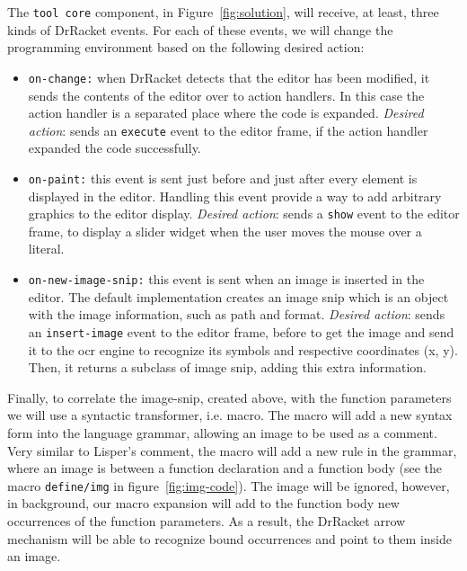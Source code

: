 The \texttt{tool core} component, in Figure~\ref{fig:solution}, will receive, at least, three kinds of DrRacket events. For each of these events, we will change the programming environment based on the following desired action:

\begin{itemize}
	\item \texttt{on-change:} when DrRacket detects that the editor has been modified, it sends the contents of the editor over to action handlers.
	In this case the action handler is a separated place where the code is expanded. \textit{Desired action}: sends an \texttt{execute} event to the editor frame, if the action handler expanded the code successfully. 

	\item \texttt{on-paint:} this event is sent just before and just after every element is displayed in the editor. Handling this event provide a way to add arbitrary graphics to the editor display. \textit{Desired action}: sends a \texttt{show} event to the editor frame, to display a slider widget when the user moves the mouse over a literal.

	\item \texttt{on-new-image-snip:} this event is sent when an image is inserted in the editor. The default implementation creates an image snip which is an object with the image information, such as path and format. \textit{Desired action}: sends an \texttt{insert-image} event to the editor frame, before to get the image and send it to the \ac{ocr} engine to recognize its symbols and respective coordinates (x, y). Then, it returns a subclass of image snip, adding this extra information.
\end{itemize}

Finally, to correlate the image-snip, created above, with the function parameters we will use a syntactic transformer, i.e. macro. The macro will add a new syntax form into the language grammar, allowing an image to be used as a comment. Very similar to Lisper's comment, the macro will add a new rule in the grammar, where an image is between a function declaration and a function body (see the macro \texttt{define/img} in figure~\ref{fig:img-code}). The image will be ignored, however, in background, our macro expansion will add to the function body new occurrences of the function parameters. As a result, the DrRacket arrow mechanism will be able to recognize bound occurrences and point to them inside an image.